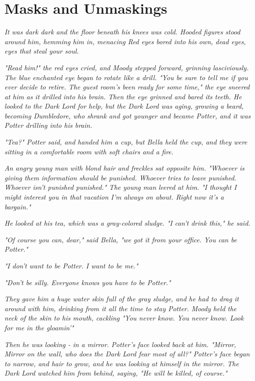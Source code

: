 
\chapter{Masks and Unmaskings}

\emph{It was dark{\el} dark{\el} and the floor beneath his knees was cold. Hooded figures stood around him, hemming him in, menacing{\el} Red eyes bored into his own, dead eyes, eyes that steal your soul.}

\emph{"Read him!" the red eyes cried, and Moody stepped forward, grinning lasciviously. The blue enchanted eye began to rotate like a drill. "You be sure to tell me if you ever decide to retire. The guest room's been ready for some time," the eye sneered at him as it drilled into his brain. Then the eye grinned and bared its teeth. He looked to the Dark Lord for help, but the Dark Lord was aging, growing a beard, becoming Dumbledore, who shrank and got younger and became Potter, and it was Potter drilling into his brain.}

\emph{"Tea?" Potter said, and handed him a cup, but Bella held the cup, and they were sitting in a comfortable room with soft chairs and a fire.}

\emph{An angry young man with blond hair and freckles sat opposite him. "Whoever is giving them information should be punished. Whoever tries to leave{\el} punished. Whoever isn't punished{\el} punished." The young man leered at him. "I thought I might interest you in that vacation I'm always on about. Right now it's a bargain."}

\emph{He looked at his tea, which was a gray-colored sludge. "I can't drink this," he said.}

\emph{"Of course you can, dear," said Bella, "we got it from your office. You can be Potter."}

\emph{"I don't want to be Potter. I want to be me."}

\emph{"Don't be silly. Everyone knows you have to be Potter."}

\emph{They gave him a huge water skin full of the gray sludge, and he had to drag it around with him, drinking from it all the time to stay Potter. Moody held the neck of the skin to his mouth, cackling "You never know. You never know. Look for me in the gloamin'"}

\emph{Then he was looking - in a mirror. Potter's face looked back at him. "Mirror, Mirror on the wall, who does the Dark Lord fear most of all?" Potter's face began to narrow, and hair to grow, and he was looking at himself in the mirror. The Dark Lord watched him from behind, saying, "He will be killed, of course."}

